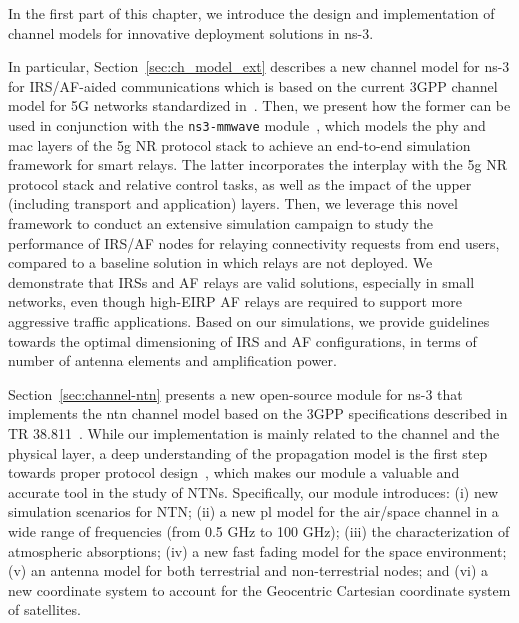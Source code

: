 In the first part of this chapter, we introduce the design and implementation of channel models for innovative deployment solutions in ns-3. 

In particular, Section~\ref{sec:ch_model_ext} describes a new channel model for ns-3 for IRS/AF-aided communications which is based on the current 3GPP channel model for 5G networks standardized in~\cite{3gpp.38.901}. 
Then, we present how the former can be used in conjunction with the \texttt{ns3-mmwave} module~\cite{mezzavilla2018end}, which models the \gls{phy} and \gls{mac} layers of the \gls{5g} NR protocol stack to achieve an end-to-end simulation framework for smart relays. The latter incorporates the interplay with the \gls{5g} NR protocol stack and relative control tasks, as well as the impact of the upper (including transport and application) layers. Then, we leverage this novel framework to conduct an extensive simulation campaign to study the performance of IRS/AF nodes for relaying connectivity requests from end users, compared to a baseline solution in which relays are not deployed. We demonstrate that IRSs and AF relays are valid solutions, especially in small networks, even though high-EIRP AF relays are required to support more aggressive traffic applications. Based on our simulations, we provide guidelines towards the optimal dimensioning of IRS and AF configurations, in terms of number of antenna elements and amplification power.

Section~\ref{sec:channel-ntn} presents a new open-source module for ns-3 that implements the \gls{ntn} channel model based on the 3GPP specifications described in TR 38.811~\cite{38811}.
While our implementation is mainly related to the channel and the physical layer, a deep understanding of the propagation model is the first step towards proper protocol design~\cite{lecci2021accuracy}, which makes our module a valuable and accurate tool in the study of NTNs.
Specifically, our module introduces: (i) new simulation scenarios for NTN; (ii) a new \gls{pl} model for the air/space channel in a wide range of frequencies (from 0.5 GHz to 100 GHz); (iii) the characterization of atmospheric absorptions; (iv) a new fast fading model for the space environment; (v) an antenna model for both terrestrial and non-terrestrial nodes; and (vi) a new coordinate system to account for the Geocentric Cartesian coordinate system of satellites. 

